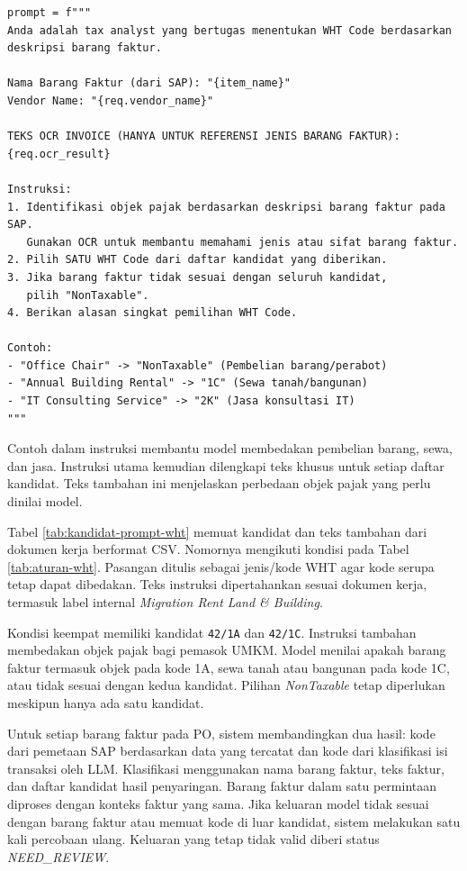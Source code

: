 \begin{lstlisting}[caption={Cuplikan instruksi utama untuk klasifikasi WHT}, label={lst:prompt-instruksi-wht}, frame=single, captionpos=t, numbers=none]
prompt = f"""
Anda adalah tax analyst yang bertugas menentukan WHT Code berdasarkan deskripsi barang faktur.

Nama Barang Faktur (dari SAP): "{item_name}"
Vendor Name: "{req.vendor_name}"

TEKS OCR INVOICE (HANYA UNTUK REFERENSI JENIS BARANG FAKTUR):
{req.ocr_result}

Instruksi:
1. Identifikasi objek pajak berdasarkan deskripsi barang faktur pada SAP.
   Gunakan OCR untuk membantu memahami jenis atau sifat barang faktur.
2. Pilih SATU WHT Code dari daftar kandidat yang diberikan.
3. Jika barang faktur tidak sesuai dengan seluruh kandidat,
   pilih "NonTaxable".
4. Berikan alasan singkat pemilihan WHT Code.

Contoh:
- "Office Chair" -> "NonTaxable" (Pembelian barang/perabot)
- "Annual Building Rental" -> "1C" (Sewa tanah/bangunan)
- "IT Consulting Service" -> "2K" (Jasa konsultasi IT)
"""
\end{lstlisting}

Contoh dalam instruksi membantu model membedakan pembelian barang, sewa, dan jasa. Instruksi utama kemudian dilengkapi teks khusus untuk setiap daftar kandidat. Teks tambahan ini menjelaskan perbedaan objek pajak yang perlu dinilai model.

Tabel \ref{tab:kandidat-prompt-wht} memuat kandidat dan teks tambahan dari dokumen kerja berformat \label{abbr:CSV}CSV. Nomornya mengikuti kondisi pada Tabel \ref{tab:aturan-wht}. Pasangan ditulis sebagai jenis/kode WHT agar kode serupa tetap dapat dibedakan. Teks instruksi dipertahankan sesuai dokumen kerja, termasuk label internal \textit{Migration Rent Land \& Building}.



Kondisi keempat memiliki kandidat \texttt{42/1A} dan \texttt{42/1C}. Instruksi tambahan membedakan objek pajak bagi pemasok UMKM. Model menilai apakah barang faktur termasuk objek pada kode 1A, sewa tanah atau bangunan pada kode 1C, atau tidak sesuai dengan kedua kandidat. Pilihan \textit{NonTaxable} tetap diperlukan meskipun hanya ada satu kandidat.

Untuk setiap barang faktur pada PO, sistem membandingkan dua hasil: kode dari pemetaan SAP berdasarkan data yang tercatat dan kode dari klasifikasi isi transaksi oleh LLM. Klasifikasi menggunakan nama barang faktur, teks faktur, dan daftar kandidat hasil penyaringan. Barang faktur dalam satu permintaan diproses dengan konteks faktur yang sama. Jika keluaran model tidak sesuai dengan barang faktur atau memuat kode di luar kandidat, sistem melakukan satu kali percobaan ulang. Keluaran yang tetap tidak valid diberi status \textit{NEED\_REVIEW}.

